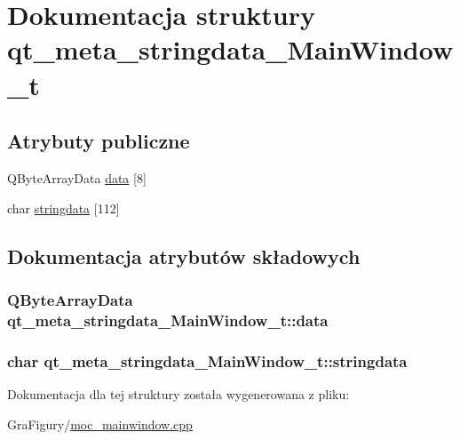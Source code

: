 \hypertarget{structqt__meta__stringdata__MainWindow__t}{\section{Dokumentacja struktury qt\-\_\-meta\-\_\-stringdata\-\_\-\-Main\-Window\-\_\-t}
\label{structqt__meta__stringdata__MainWindow__t}
}
\subsection*{Atrybuty publiczne}
\begin{DoxyCompactItemize}
\item 
Q\-Byte\-Array\-Data \hyperlink{structqt__meta__stringdata__MainWindow__t_a092956d0ba2e51cd73092e8a5ebb6ce6}{data} \mbox{[}8\mbox{]}
\item 
char \hyperlink{structqt__meta__stringdata__MainWindow__t_ae3869d7e78ea673a776919d95533660f}{stringdata} \mbox{[}112\mbox{]}
\end{DoxyCompactItemize}


\subsection{Dokumentacja atrybutów składowych}
\hypertarget{structqt__meta__stringdata__MainWindow__t_a092956d0ba2e51cd73092e8a5ebb6ce6}{
\subsubsection[{data}]{\setlength{\rightskip}{0pt plus 5cm}Q\-Byte\-Array\-Data qt\-\_\-meta\-\_\-stringdata\-\_\-\-Main\-Window\-\_\-t\-::data}}\label{structqt__meta__stringdata__MainWindow__t_a092956d0ba2e51cd73092e8a5ebb6ce6}
\hypertarget{structqt__meta__stringdata__MainWindow__t_ae3869d7e78ea673a776919d95533660f}{
\subsubsection[{stringdata}]{\setlength{\rightskip}{0pt plus 5cm}char qt\-\_\-meta\-\_\-stringdata\-\_\-\-Main\-Window\-\_\-t\-::stringdata}}\label{structqt__meta__stringdata__MainWindow__t_ae3869d7e78ea673a776919d95533660f}


Dokumentacja dla tej struktury została wygenerowana z pliku\-:\begin{DoxyCompactItemize}
\item 
Gra\-Figury/\hyperlink{GraFigury_2moc__mainwindow_8cpp}{moc\-\_\-mainwindow.\-cpp}\end{DoxyCompactItemize}
